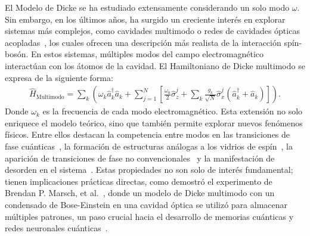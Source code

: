 \documentclass[onecolumn,notitlepage,letterpaper,aps,pra,12pt]{article}
\numberwithin{equation}{section}
\begin{document}
El Modelo de Dicke se ha estudiado extensamente considerando un solo modo $\omega$. %
Sin embargo, en los últimos años, ha surgido un creciente interés en explorar sistemas más complejos, como cavidades multimodo o redes de cavidades ópticas acopladas~\cite{tolkunov2007,fiorelli2020,carollo2021}, los cuales ofrecen una descripción más realista de la interacción spín-bosón. En estos sistemas, múltiples modos del campo electromagnético interactúan con los átomos de la cavidad. El Hamiltoniano de Dicke multimodo se expresa de la siguiente forma:
\begin{gather}
        \hat{H}_{\text{Multimodo}} = \sum_{k}\left(\omega_{k}\hat{a}^{\dagger}_{k}\hat{a}_{k} + \sum_{j=1}^{N}\left[ \frac{\omega_{0}}{2}\hat{\sigma}_{z}^{j} + \sum_{k}\frac{g_{k}}{\sqrt{N}}\hat{\sigma}_{x}^{j}\left(\hat{a}^{\dagger}_{k} + \hat{a}_{k}\right) \right]\right).
\end{gather}
Donde $\omega_{k}$ es la frecuencia de cada modo electromagnético. Esta extensión no solo enriquece el modelo teórico, sino que también permite explorar nuevos fenómenos físicos. Entre ellos destacan la competencia entre modos en las transiciones de fase cuánticas~\cite{tolkunov2007}, la formación de estructuras análogas a los vidrios de espín~\cite{rotondo2015}, la aparición de transiciones de fase no convencionales~\cite{kipf2014} y la manifestación de desorden en el sistema~\cite{vojta2013,das2024}. Estas propiedades no son solo de interés fundamental; tienen implicaciones prácticas directas, como demostró el experimento de Brendan P. Marsch, et al.~\cite{marsch2021}, donde un modelo de Dicke multimodo con un condensado de Bose-Einstein en una cavidad óptica se utilizó para almacenar múltiples patrones, un paso crucial hacia el desarrollo de memorias cuánticas y redes neuronales cuánticas~\cite{fiorelli2020}.




\end{document}
